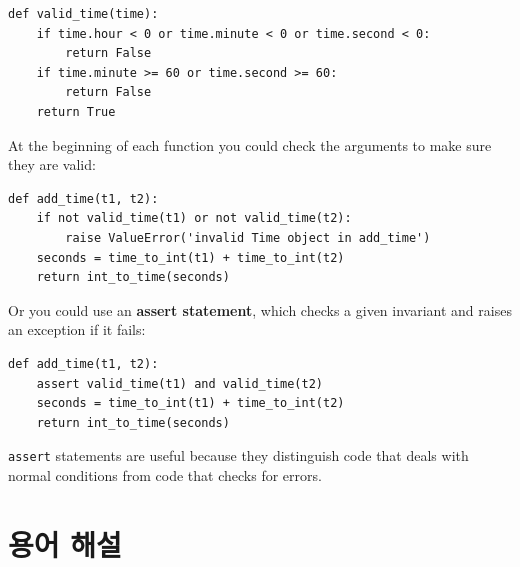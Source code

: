 \documentclass[10pt]{book}
\begin{document}
\begin{verbatim}
def valid_time(time):
    if time.hour < 0 or time.minute < 0 or time.second < 0:
        return False
    if time.minute >= 60 or time.second >= 60:
        return False
    return True
\end{verbatim}
%
At the beginning of each function you could check the
arguments to make sure they are valid:

\begin{verbatim}
def add_time(t1, t2):
    if not valid_time(t1) or not valid_time(t2):
        raise ValueError('invalid Time object in add_time')
    seconds = time_to_int(t1) + time_to_int(t2)
    return int_to_time(seconds)
\end{verbatim}
%
Or you could use an {\bf assert statement}, which checks a given invariant
and raises an exception if it fails:

\begin{verbatim}
def add_time(t1, t2):
    assert valid_time(t1) and valid_time(t2)
    seconds = time_to_int(t1) + time_to_int(t2)
    return int_to_time(seconds)
\end{verbatim}
%
{\tt assert} statements are useful because they distinguish
code that deals with normal conditions from code
that checks for errors.


\section{용어 해설}
\end{document}
